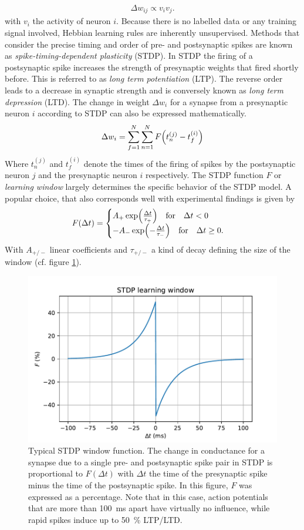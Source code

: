 \begin{align}
    \Delta w_{ij} \propto v_i v_j.
\end{align}
with $v_i$ the activity of neuron $i$. Because there is no labelled data or any training signal involved, Hebbian learning rules are inherently unsupervised. Methods that consider the precise timing and order of pre- and postsynaptic spikes are known as \emph{spike-timing-dependent plasticity} (STDP). In STDP the firing of a postsynaptic spike increases the strength of presynaptic weights that fired shortly before. This is referred to as \emph{long term potentiation} (LTP). The reverse order leads to a decrease in synaptic strength and is conversely known as \emph{long term depression} (LTD). The change in weight $\Delta w_i$ for a synapse from a presynaptic neuron $i$ according to STDP can also be expressed mathematically.
\begin{align}
    \Delta w_i = \sum_{f=1}^N\sum_{n=1}^NF\qty(t_n^{(j)}-t_f^{(i)})
\end{align}
Where $t_n^{(j)}$ and $t_f^{(i)}$ denote the times of the firing of spikes by the postsynaptic neuron $j$ and the presynaptic neuron $i$ respectively. The STDP function $F$ or \emph{learning window} largely determines the specific behavior of the STDP model. A popular choice, that also corresponds well with experimental findings \cite{song2000competitive} is given by
\begin{align}
    F(\Delta t) = \begin{cases}
      A_+\exp(\frac{\Delta t}{\tau_+})\qq{for} \Delta t < 0\\
      -A_-\exp(-\frac{\Delta t}{\tau_-})\qq{for} \Delta t \geq 0.
    \end{cases}
\end{align}
With $A_{+/-}$ linear coefficients and $\tau_{+/-}$ a kind of decay defining the size of the window (cf. figure \ref{fig:stdp}).
\begin{figure}
    \centering
\includegraphics[width=.7\textwidth]{figures/stdp_window.pdf}
\caption[Typical STDP window function]{Typical STDP window function. The change in conductance for a synapse due to a single pre- and postsynaptic spike pair in STDP is proportional to $F(\Delta t)$ with $\Delta t$ the time of the presynaptic spike minus the time of the postsynaptic spike. In this figure, $F$ was expressed as a percentage. Note that in this case, action potentials that are more than \SI{100}{\milli\second} apart have virtually no influence, while rapid spikes induce up to \SI{50}{\percent} LTP/LTD.}\label{fig:stdp}
\end{figure}\noindent
